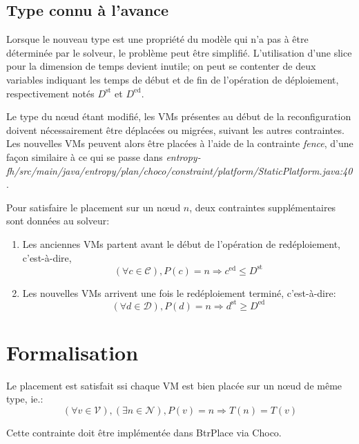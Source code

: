 \documentclass[a4paper]{article}
\begin{document}
\subsection{Type connu à l'avance}
Lorsque le nouveau type est une propriété du modèle qui n'a pas à être
déterminée par le solveur, le problème peut être simplifié. L'utilisation
d'une slice pour la dimension de temps devient inutile; on peut se contenter
de deux variables indiquant les temps de début et de fin de l'opération de
déploiement, respectivement notés $D^\mathrm{st}$ et $D^\mathrm{ed}$.

Le type du nœud étant modifié, les VMs présentes au début de la reconfiguration
doivent nécessairement être déplacées ou migrées, suivant les autres
contraintes. Les nouvelles VMs peuvent alors être placées à l'aide de
la contrainte \textit{fence}, d'une façon similaire à ce qui se passe dans
\textit{entropy-fh/src/main/java/entropy/plan/choco/constraint/platform/StaticPlatform.java:40}.

Pour satisfaire le placement sur un nœud $n$, deux contraintes supplémentaires sont
données au solveur:
\begin{enumerate}
	\item Les anciennes VMs partent avant le début de l'opération de
		redéploiement, c'est-à-dire,
\[
	(\forall c \in \mathcal C), P(c) = n \Rightarrow c^\mathrm{ed} \leq D^\mathrm{st}
\]
	\item Les nouvelles VMs arrivent une fois le redéploiement terminé,
		c'est-à-dire:
\[
	(\forall d \in \mathcal D), P(d) = n \Rightarrow d^\mathrm{st} \geq D^\mathrm{ed}
\]
\end{enumerate}


\section{Formalisation}
Le placement est satisfait ssi chaque VM est bien placée sur
un nœud de même type, ie.:
\[
	(\forall v \in \mathcal V), (\exists n \in \mathcal N), P(v) = n
		\Rightarrow T(n) = T(v)	
\]

Cette contrainte doit être implémentée dans BtrPlace via Choco.

\newpage
{}


\end{document}
